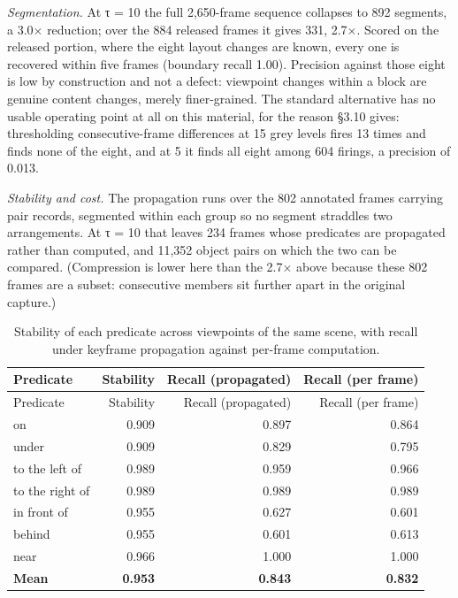 \textit{Segmentation.} At τ = 10 the full 2,650-frame sequence collapses to 892 segments, a 3.0$\times$ reduction; over the 884 released frames it gives 331, 2.7$\times$. Scored on the released portion, where the eight layout changes are known, every one is recovered within five frames (boundary recall 1.00). Precision against those eight is low by construction and not a defect: viewpoint changes within a block are genuine content changes, merely finer-grained. The standard alternative has no usable operating point at all on this material, for the reason \S3.10 gives: thresholding consecutive-frame differences at 15 grey levels fires 13 times and finds none of the eight, and at 5 it finds all eight among 604 firings, a precision of 0.013.

\textit{Stability and cost.} The propagation runs over the 802 annotated frames carrying pair records, segmented within each group so no segment straddles two arrangements. At τ = 10 that leaves 234 frames whose predicates are propagated rather than computed, and 11,352 object pairs on which the two can be compared. (Compression is lower here than the 2.7$\times$ above because these 802 frames are a subset: consecutive members sit further apart in the original capture.)

\begin{center}
\small
\begin{longtable}{lrrr}
\caption{Stability of each predicate across viewpoints of the same scene, with recall under keyframe propagation against per-frame computation.}\\
\hline
Predicate & Stability & Recall (propagated) & Recall (per frame) \\
\hline
\endfirsthead
\hline
Predicate & Stability & Recall (propagated) & Recall (per frame) \\
\hline
\endhead
on & 0.909 & 0.897 & 0.864 \\
under & 0.909 & 0.829 & 0.795 \\
to the left of & 0.989 & 0.959 & 0.966 \\
to the right of & 0.989 & 0.989 & 0.989 \\
in front of & 0.955 & 0.627 & 0.601 \\
behind & 0.955 & 0.601 & 0.613 \\
near & 0.966 & 1.000 & 1.000 \\
\textbf{Mean} & \textbf{0.953} & \textbf{0.843} & \textbf{0.832} \\
\hline
\end{longtable}
\end{center}

